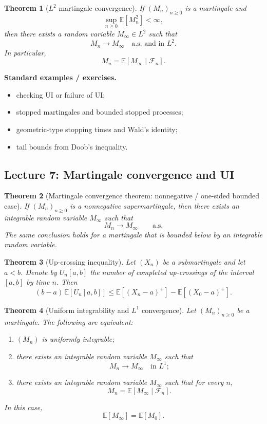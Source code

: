 \documentclass[11pt]{article}
\newtheorem{theorem}{Theorem}[section]
\theoremstyle{definition}
\begin{document}
\begin{theorem}[$L^2$ martingale convergence]
If $(M_n)_{n\ge 0}$ is a martingale and
\[
\sup_{n\ge 0}\mathbb E[M_n^2]<\infty,
\]
then there exists a random variable $M_\infty\in L^2$ such that
\[
M_n\to M_\infty \quad \text{a.s. and in } L^2.
\]
In particular,
\[
M_n=\mathbb E[M_\infty\mid \mathcal F_n].
\]
\end{theorem}

\textbf{Standard examples / exercises.}
\begin{itemize}[leftmargin=2em]
    \item checking UI or failure of UI;
    \item stopped martingales and bounded stopped processes;
    \item geometric-type stopping times and Wald's identity;
    \item tail bounds from Doob's inequality.
\end{itemize}

\subsection{Lecture 7: Martingale convergence and UI}

\begin{theorem}[Martingale convergence theorem: nonnegative / one-sided bounded case]
If $(M_n)_{n\ge 0}$ is a nonnegative supermartingale, then there exists an integrable random variable $M_\infty$ such that
\[
M_n\to M_\infty \qquad \text{a.s.}
\]
The same conclusion holds for a martingale that is bounded below by an integrable random variable.
\end{theorem}

\begin{theorem}[Up-crossing inequality]
Let $(X_n)$ be a submartingale and let $a<b$. Denote by $U_n[a,b]$ the number of completed up-crossings of the interval $[a,b]$ by time $n$. Then
\[
(b-a)\,\mathbb E[U_n[a,b]]
\le
\mathbb E[(X_n-a)^+] - \mathbb E[(X_0-a)^+].
\]
\end{theorem}

\begin{theorem}[Uniform integrability and $L^1$ convergence]
Let $(M_n)_{n\ge 0}$ be a martingale. The following are equivalent:
\begin{enumerate}[label=(\roman*)]
    \item $(M_n)$ is uniformly integrable;
    \item there exists an integrable random variable $M_\infty$ such that
    \[
    M_n\to M_\infty \quad \text{in } L^1;
    \]
    \item there exists an integrable random variable $M_\infty$ such that for every $n$,
    \[
    M_n=\mathbb E[M_\infty\mid \mathcal F_n].
    \]
\end{enumerate}
In this case,
\[
\mathbb E[M_\infty]=\mathbb E[M_0].
\]
\end{theorem}
\end{document}
